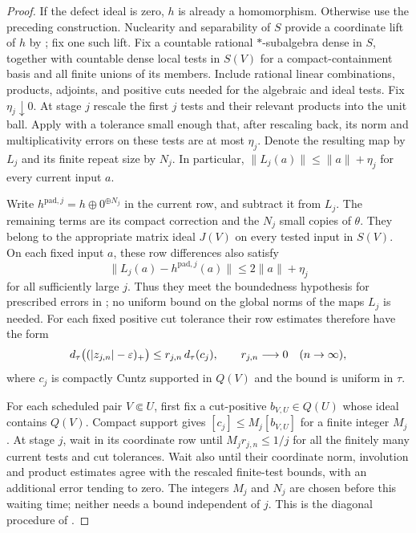\begin{proof}
If the defect ideal is zero, $h$ is already a homomorphism.
Otherwise use the preceding construction.  Nuclearity and separability
of $S$ provide a \cpc coordinate lift of $h$ by
\cite[Theorem~3.10]{ChoiEffrosLifting}; fix one such lift.
Fix a countable
rational $*$-subalgebra dense in $S$, together with countable
dense local tests in $S(V)$ for a compact-containment basis and
all finite unions of its members.  Include rational linear
combinations, products, adjoints, and positive cuts needed for
the algebraic and ideal tests.  Fix $\eta_j\downarrow0$.  At stage $j$
rescale the first $j$ tests and their relevant products into the unit
ball.  Apply  with a tolerance small enough
that, after rescaling back, its norm and multiplicativity errors on
these tests are at most $\eta_j$.  Denote the resulting map by $L_j$
and its finite repeat size by $N_j$.  In particular,
$\|L_j(a)\|\leq\|a\|+\eta_j$ for every current input $a$.

Write $h^{\mathrm{pad},j}=h\oplus0^{\oplus N_j}$ in the current
row, and subtract it from $L_j$.  The remaining terms
are its compact correction and the $N_j$ small copies of
$\theta$.  They belong to the appropriate matrix ideal $J(V)$
on every tested input in $S(V)$.  On each fixed input $a$, these row
differences also satisfy
\[
 \|L_j(a)-h^{\mathrm{pad},j}(a)\|
 \leq2\|a\|+\eta_j
\]
for all sufficiently large $j$.  Thus they meet the boundedness
hypothesis for prescribed errors in ; no uniform
bound on the global norms of the maps $L_j$ is needed.
For each fixed positive cut
tolerance their row estimates therefore have the form
\begin{equation}\label{cc:row-smallness}
 d_\tau\bigl((|z_{j,n}|-\varepsilon)_+\bigr)
 \le r_{j,n}\,d_\tau(c_j),\qquad
 r_{j,n}\longrightarrow0\quad(n\to\infty),
\end{equation}
where $c_j$ is compactly Cuntz supported in $Q(V)$ and the
bound is uniform in $\tau$.

For each scheduled pair $V\Subset U$, first fix a cut-positive
$b_{V,U}\in Q(U)$ whose ideal contains $Q(V)$.  Compact support
gives $[c_j]\le M_j[b_{V,U}]$ for a finite integer $M_j$.
At stage $j$, wait in its coordinate row until
$M_jr_{j,n}\le 1/j$ for all the finitely many current tests and
cut tolerances.  Wait also until their coordinate norm,
involution and product estimates agree with the rescaled finite-test
bounds, with an additional error tending to zero.  The integers $M_j$
and $N_j$ are chosen before this waiting time; neither needs a bound independent of $j$.
This is the diagonal procedure of .


\end{proof}
